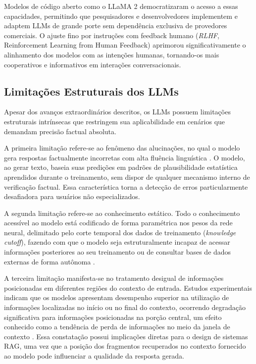 \documentclass[
	12pt,				%
	openright,			%
	oneside,			%
	a4paper,			%
	tccpreliminar,		%
	]{ABNT-DC-UEL}
\begin{document}
Modelos de código aberto como o LLaMA 2 \cite{touvron2023llama} democratizaram o acesso a essas capacidades, permitindo que pesquisadores e desenvolvedores implementem e adaptem LLMs de grande porte sem dependência exclusiva de provedores comerciais. O ajuste fino por instruções com feedback humano (\textit{RLHF}, Reinforcement Learning from Human Feedback) \cite{ouyang2022instructgpt} aprimorou significativamente o alinhamento dos modelos com as intenções humanas, tornando-os mais cooperativos e informativos em interações conversacionais.

\subsection{Limitações Estruturais dos LLMs}

Apesar dos avanços extraordinários descritos, os LLMs possuem limitações estruturais intrínsecas que restringem sua aplicabilidade em cenários que demandam precisão factual absoluta.

A primeira limitação refere-se ao fenômeno das alucinações, no qual o modelo gera respostas factualmente incorretas com alta fluência linguística \cite{ji2023hallucination}. O modelo, ao gerar texto, baseia suas predições em padrões de plausibilidade estatística aprendidos durante o treinamento, sem dispor de qualquer mecanismo interno de verificação factual. Essa característica torna a detecção de erros particularmente desafiadora para usuários não especializados.

A segunda limitação refere-se ao conhecimento estático. Todo o conhecimento acessível ao modelo está codificado de forma paramétrica nos pesos da rede neural, delimitado pelo corte temporal dos dados de treinamento (\textit{knowledge cutoff}), fazendo com que o modelo seja estruturalmente incapaz de acessar informações posteriores ao seu treinamento ou de consultar bases de dados externas de forma autônoma \cite{lewis2020rag}.

A terceira limitação manifesta-se no tratamento desigual de informações posicionadas em diferentes regiões do contexto de entrada. Estudos experimentais indicam que os modelos apresentam desempenho superior na utilização de informações localizadas no início ou no final do contexto, ocorrendo degradação significativa para informações posicionadas na porção central, um efeito conhecido como a tendência de perda de informações no meio da janela de contexto \cite{liu2023lostmiddle}. Essa constatação possui implicações diretas para o design de sistemas RAG, uma vez que a posição dos fragmentos recuperados no contexto fornecido ao modelo pode influenciar a qualidade da resposta gerada.
\end{document}
